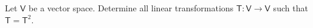 Let $\mathsf{V}$ be a vector space. Determine all linear
transformations $\mathsf{T}\colon \mathsf{V}\to\mathsf{V}$ such that
$\mathsf{T}=\mathsf{T}^2$.
